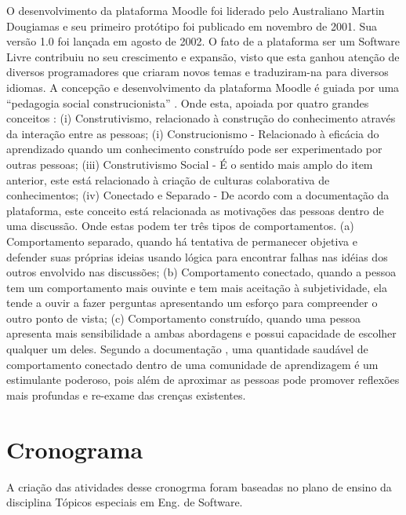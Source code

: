 O desenvolvimento da plataforma Moodle foi liderado pelo Australiano Martin  Dougiamas e seu primeiro protótipo foi publicado em novembro de 2001. Sua versão 1.0 foi lançada em agosto de 2002. O fato de a plataforma ser um Software Livre contribuiu no seu crescimento e expansão, visto que esta ganhou atenção de diversos programadores que criaram novos temas e traduziram-na para diversos idiomas.   A concepção e desenvolvimento da plataforma Moodle é guiada por uma  “pedagogia social construcionista” \cite{moodle}.
Onde esta, apoiada por quatro grandes conceitos  : (i) Construtivismo, relacionado à construção do conhecimento através da interação entre as pessoas; (i) Construcionismo - Relacionado à eficácia do aprendizado quando um conhecimento construído pode ser experimentado por outras pessoas; (iii) Construtivismo Social - É o sentido mais amplo do item anterior, este está relacionado à criação de culturas colaborativa de conhecimentos; (iv) Conectado e Separado - De acordo com a documentação da plataforma, este conceito está relacionada as motivações das pessoas dentro de uma discussão. Onde estas podem ter três tipos de comportamentos. (a) Comportamento separado, quando há tentativa de permanecer objetiva e defender suas próprias ideias usando lógica para encontrar falhas nas idéias dos outros envolvido nas discussões; (b) Comportamento conectado, quando a pessoa tem um comportamento mais ouvinte e tem mais aceitação à subjetividade, ela tende a ouvir a fazer perguntas apresentando um esforço para compreender o outro ponto de vista; (c) Comportamento construído, quando uma pessoa apresenta mais sensibilidade a ambas abordagens e possui capacidade de escolher qualquer um deles. Segundo a documentação \cite{moodle}, uma quantidade saudável de comportamento conectado dentro de uma comunidade de aprendizagem é um estimulante poderoso, pois além de aproximar as pessoas pode promover reflexões mais profundas e re-exame das crenças existentes.



\section{Cronograma}
A criação das atividades desse cronogrma foram baseadas no plano de ensino da disciplina Tópicos especiais em Eng. de Software. 

